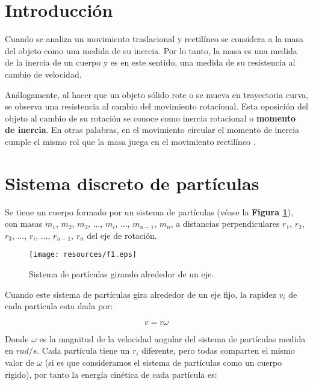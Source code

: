 \documentclass[letter,oneside,11pt]{article}
\begin{document}
\clearpage
\setcounter{page}{1}

\tableofcontents
\newpage

\section{Introducción}
Cuando se analiza un movimiento traslacional y rectilíneo se considera a la masa
del objeto como una medida de su inercia. Por lo tanto, la masa es una medida de
la inercia de un cuerpo y es en este sentido, una medida de su resistencia al
cambio de velocidad.

Análogamente, al hacer que un objeto sólido rote o se mueva en trayectoria
curva, se observa una resistencia al cambio del movimiento rotacional. Esta
oposición del objeto al cambio de su rotación se conoce como inercia rotacional
o \textbf{momento de inercia}. En otras palabras, en el movimiento circular el
momento de inercia cumple el mismo rol que la masa juega en el movimiento
rectilíneo \cite{FISIC.CH}.

\section{Sistema discreto de partículas \cite{Sears}}
Se tiene un cuerpo formado por un sistema de partículas (véase la \textbf{Figura
\ref{figura1}}), con masas $m_1$, $m_2$, $m_3$, ..., $m_i$, ..., $m_{n-1}$,
$m_n$, a distancias perpendiculares $r_1$, $r_2$, $r_3$, ..., $r_i$, ...,
$r_{n-1}$, $r_n$ del eje de rotación.

\begin{figure}
\centering
\texttt{[image: resources/f1.eps]}
\caption{Sistema de partículas girando alrededor de un eje.}
\label{figura1}
\end{figure}

Cuando este sistema de partículas gira alrededor de un eje fijo, la rapidez
$v_i$ de cada partícula esta dada por:

\begin{equation*}
    v = r \omega
\label{velocidad}
\end{equation*}

Donde $\omega$ es la magnitud de la velocidad angular del sistema de partículas
medida en $rad/s$. Cada partícula tiene un $r_i$ diferente, pero todas comparten
el mismo valor de $\omega$ (si es que consideramos el sistema de partículas como
un cuerpo rígido), por tanto la energía cinética de cada partícula es:
\end{document}
